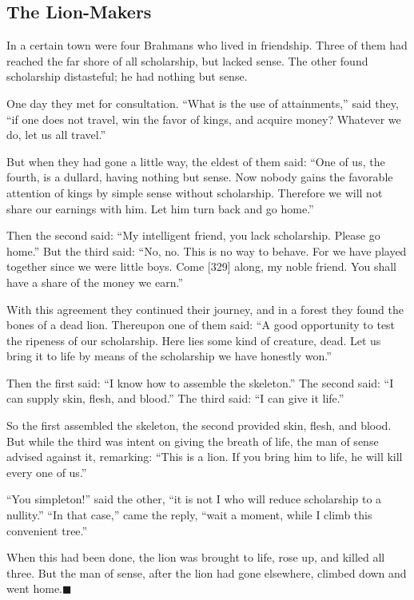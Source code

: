 \documentclass[article, twoside, 14pt]{memoir}
\newcommand{\qed}{\hfill \ensuremath{\blacksquare}}
\begin{document}
\subsection{The Lion-Makers}

\label{s82}

In a certain town were four Brahmans who lived in friendship. Three
of them had reached the far shore of all scholarship, but lacked
sense. The other found scholarship distasteful; he had nothing but
sense.

One day they met for consultation.
``What is the use of attainments,'' said they,
``if one does not travel, win the favor of kings, and acquire money? Whatever we do, let us all travel.''

But when they had gone a little way, the eldest of them said:
``One of us, the fourth, is a dullard, having nothing but sense. Now nobody gains the favorable attention of kings by simple sense without scholarship. Therefore we will not share our earnings with him. Let him turn back and go home.''

Then the second said:
``My intelligent friend, you lack scholarship. Please go home.''
But the third said:
``No, no. This is no way to behave. For we have played together since we were little boys. Come [329] along, my noble friend. You shall have a share of the money we earn.''

With this agreement they continued their journey, and in a forest
they found the bones of a dead lion. Thereupon one of them said:
``A good opportunity to test the ripeness of our scholarship. Here lies some kind of creature, dead. Let us bring it to life by means of the scholarship we have honestly won.''

Then the first said: ``I know how to assemble the skeleton.'' The
second said: ``I can supply skin, flesh, and blood.'' The third
said: ``I can give it life.''

So the first assembled the skeleton, the second provided skin,
flesh, and blood. But while the third was intent on giving the
breath of life, the man of sense advised against it, remarking:
``This is a lion. If you bring him to life, he will kill every one of us.''

``You simpleton!'' said the other,
``it is not I who will reduce scholarship to a nullity.''
``In that case,'' came the reply,
``wait a moment, while I climb this convenient tree.''

When this had been done, the lion was brought to life, rose up, and
killed all three. But the man of sense, after the lion had gone
elsewhere, climbed down and went home.\hyperref[s82]{\qed}
\end{document}
